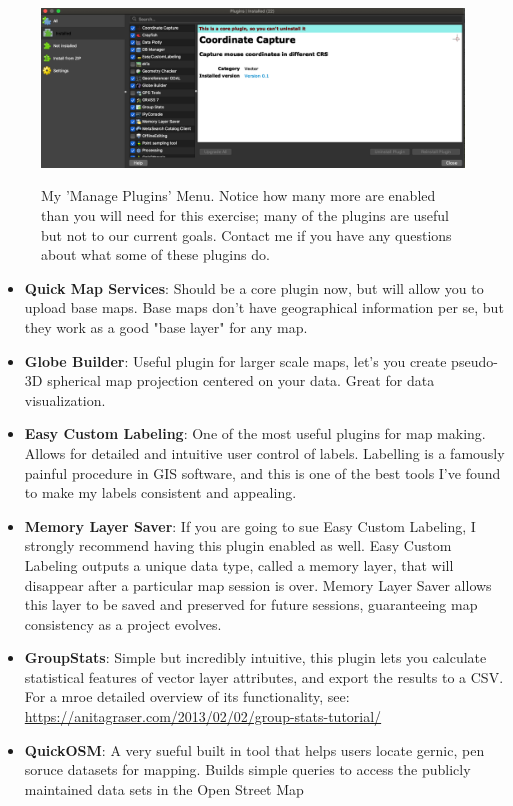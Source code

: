 \documentclass{article}
\begin{document}
\begin{figure}[htbp]
    \centering
    \includegraphics[width=\textwidth]{FIgure4_Plugin_Menu.png}
    \label{fig4}
    \caption{My 'Manage Plugins' Menu. Notice how many more are enabled than you will need for this exercise; many of the plugins are useful but not to our current goals. Contact me if you have any questions about what some of these plugins do.}
\end{figure}

\begin{itemize}
    \item \textbf{Quick Map Services}: Should be a core plugin now, but will allow you to upload base maps. Base maps don't have geographical information per se, but they work as a good "base layer" for any map.
    \item \textbf{Globe Builder}: Useful plugin for larger scale maps, let's you create pseudo-3D spherical map projection centered on your data. Great for data visualization.
    \item \textbf{Easy Custom Labeling}: One of the most useful plugins for map making. Allows for detailed and intuitive user control of labels. Labelling is a famously painful procedure in GIS software, and this is one of the best tools I've found to make my labels consistent and appealing.
    \item \textbf{Memory Layer Saver}: If you are going to sue Easy Custom Labeling, I strongly recommend having this plugin enabled as well. Easy Custom Labeling outputs a unique data type, called a memory layer, that will disappear after a particular map session is over. Memory Layer Saver allows this layer to be saved and preserved for future sessions, guaranteeing map consistency as a project evolves.
    \item \textbf{GroupStats}: Simple but incredibly intuitive, this plugin lets you calculate statistical features of vector layer attributes, and export the results to a CSV. For a mroe detailed overview of its functionality, see: \href{https://anitagraser.com/2013/02/02/group-stats-tutorial/}{https://anitagraser.com/2013/02/02/group-stats-tutorial/}
    \item \textbf{QuickOSM}: A very sueful built in tool that helps users locate gernic, pen soruce datasets for mapping. Builds simple queries to access the publicly maintained data sets in the Open Street Map 
\end{itemize}
\end{document}

